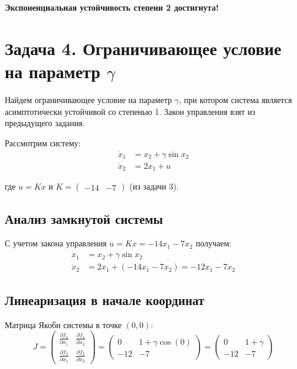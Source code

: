 \textbf{Экспоненциальная устойчивость степени 2 достигнута!}

\section{Задача 4. Ограничивающее условие на параметр $\gamma$}

Найдем ограничивающее условие на параметр $\gamma$, при котором система является асимптотически устойчивой со степенью 1. Закон управления взят из предыдущего задания.

Рассмотрим систему:
\begin{align}
\dot{x}_1 &= x_2 + \gamma \sin x_2 \\
\dot{x}_2 &= 2x_1 + u
\end{align}

где $u = Kx$ и $K = \begin{pmatrix} -14 & -7 \end{pmatrix}$ (из задачи 3).

\subsection*{Анализ замкнутой системы}

С учетом закона управления $u = Kx = -14x_1 - 7x_2$ получаем:
\begin{align}
\dot{x}_1 &= x_2 + \gamma \sin x_2 \\
\dot{x}_2 &= 2x_1 + (-14x_1 - 7x_2) = -12x_1 - 7x_2
\end{align}

\subsection*{Линеаризация в начале координат}

Матрица Якоби системы в точке $(0,0)$:
\begin{equation}
J = \begin{pmatrix} 
\frac{\partial f_1}{\partial x_1} & \frac{\partial f_1}{\partial x_2} \\
\frac{\partial f_2}{\partial x_1} & \frac{\partial f_2}{\partial x_2}
\end{pmatrix} = \begin{pmatrix} 
0 & 1 + \gamma \cos(0) \\
-12 & -7
\end{pmatrix} = \begin{pmatrix} 
0 & 1 + \gamma \\
-12 & -7
\end{pmatrix}
\end{equation}

